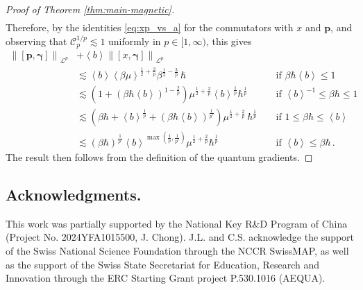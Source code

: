 \documentclass[11pt]{amsart}
\theoremstyle{plain}
\theoremstyle{definition}
\renewcommand	{\L}		{\mathcal L}		%
\newcommand		{\lt}			{\left}				%
\newcommand		{\rt}			{\right}			%
\renewcommand	{\(}			{\lt(}
\renewcommand	{\)}			{\rt)}
\newcommand		{\bangle}[1]	{\lt\langle #1\rt\rangle}
\newcommand		{\weight}[1]	{\bangle{#1}}	%
\newcommand		{\com}[1]		{\lt[{#1}\rt]}		%
\newcommand		{\nrm}[1]		{\lt\lVert #1\rt\rVert}
\newcommand		{\Nrm}[2]		{\nrm{#1}_{#2}}
\newcommand		{\cC}			{\mathcal{C}}
\newcommand		{\opgam}	{{\boldsymbol{\gamma}}}	%
\newcommand		{\opp}		{\boldsymbol{p}}
\begin{document}
\begin{proof}[Proof of Theorem \ref{thm:main-magnetic}]
\begin{align*}
		\end{align*}
        Therefore, by the identities \eqref{eq:xp_vs_a} for the commutators with $x$ and $\opp$, and observing that $\cC_p^{1/p} \lesssim 1$ uniformly in $p\in[1,\infty)$, this gives
        \begin{align*}
            \Nrm{\com{\opp,\opgam}}{\L^p} &+ \weight{b}\Nrm{\com{x,\opgam}}{\L^p}
            \\
            &\lesssim \weight{b} \weight{\beta\mu}^{\frac{1}{2}+\frac{2}{p}} \beta^{\frac{1}{2}-\frac{3}{p}} \,\hbar && \text{ if } \beta\hbar\weight{b} \leq 1
            \\
             &\lesssim \lt(1 + (\beta\hbar\weight{b})^{1-\frac{2}{p}}\rt) \mu^{\frac{1}{2}+\frac{2}{p}} \weight{b}^\frac{1}{p} \hbar^\frac{1}{p} && \text{ if } \weight{b}^{-1} \leq \beta\hbar \leq 1
            \\
             &\lesssim \lt(\beta\hbar + \weight{b}^\frac{1}{p} + (\beta\hbar\weight{b})^\frac{1}{p'}\rt) \mu^{\frac{1}{2}+\frac{2}{p}} \, \hbar^\frac{1}{p} && \text{ if } 1 \leq \beta\hbar \leq \weight{b}
            \\
             &\lesssim \lt(\beta\hbar\rt)^\frac{1}{p'} \weight{b}^{\max(\frac{1}{p},\frac{1}{p'})}\mu^{\frac{1}{2}+\frac{2}{p}} \hbar^\frac{1}{p} && \text{ if } \weight{b} \leq \beta\hbar \, .
		\end{align*}
        The result then follows from the definition of the quantum gradients.
	\end{proof}
	


\bigskip	
\subsection*{Acknowledgments.} This work was partially supported by the National Key R\&D Program of China (Project No. 2024YFA1015500, J. Chong). J.L. and C.S. acknowledge the support of the Swiss National Science Foundation through the NCCR SwissMAP, as well as the support of the Swiss State Secretariat for Education, Research and Innovation through the ERC Starting Grant project P.530.1016 (AEQUA).






	
\end{document}

